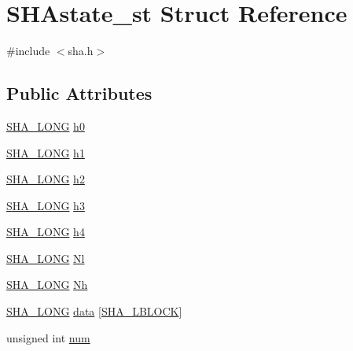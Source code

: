 \hypertarget{struct_s_h_astate__st}{}\section{S\+H\+Astate\+\_\+st Struct Reference}
\label{struct_s_h_astate__st}


{\ttfamily \#include $<$sha.\+h$>$}

\subsection*{Public Attributes}
\begin{DoxyCompactItemize}
\item 
\hyperlink{sha_8h_a1b2e699d6af9a09d35e23c231e415c6c}{S\+H\+A\+\_\+\+L\+O\+NG} \hyperlink{struct_s_h_astate__st_ab3041c8fb56553e66f5e96bea583181c}{h0}
\item 
\hyperlink{sha_8h_a1b2e699d6af9a09d35e23c231e415c6c}{S\+H\+A\+\_\+\+L\+O\+NG} \hyperlink{struct_s_h_astate__st_aae63de503961d0e23ec45fadbf762a28}{h1}
\item 
\hyperlink{sha_8h_a1b2e699d6af9a09d35e23c231e415c6c}{S\+H\+A\+\_\+\+L\+O\+NG} \hyperlink{struct_s_h_astate__st_a553b3daa14d04597c861e2482d984761}{h2}
\item 
\hyperlink{sha_8h_a1b2e699d6af9a09d35e23c231e415c6c}{S\+H\+A\+\_\+\+L\+O\+NG} \hyperlink{struct_s_h_astate__st_a5219d68f2bee6867f2775d467691ad24}{h3}
\item 
\hyperlink{sha_8h_a1b2e699d6af9a09d35e23c231e415c6c}{S\+H\+A\+\_\+\+L\+O\+NG} \hyperlink{struct_s_h_astate__st_abd5013d45dc77b9f31df5818e02c80d1}{h4}
\item 
\hyperlink{sha_8h_a1b2e699d6af9a09d35e23c231e415c6c}{S\+H\+A\+\_\+\+L\+O\+NG} \hyperlink{struct_s_h_astate__st_abe78332975c3f20418c6a32381904bba}{Nl}
\item 
\hyperlink{sha_8h_a1b2e699d6af9a09d35e23c231e415c6c}{S\+H\+A\+\_\+\+L\+O\+NG} \hyperlink{struct_s_h_astate__st_aedd943b5d71b31cb22d3a7fecf05575e}{Nh}
\item 
\hyperlink{sha_8h_a1b2e699d6af9a09d35e23c231e415c6c}{S\+H\+A\+\_\+\+L\+O\+NG} \hyperlink{struct_s_h_astate__st_ae8c8b0b2b3c60370a97459696f93e9da}{data} \mbox{[}\hyperlink{sha_8h_a8902af97bc4411166213b43c6d2057d2}{S\+H\+A\+\_\+\+L\+B\+L\+O\+CK}\mbox{]}
\item 
unsigned int \hyperlink{struct_s_h_astate__st_a58f39bf4cf04c1f4796f6df5031bc746}{num}
\end{DoxyCompactItemize}


